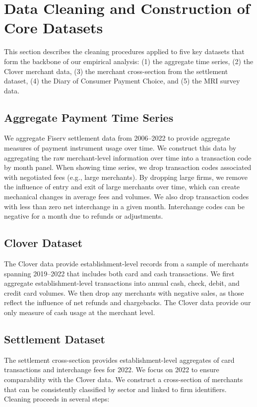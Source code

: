 \documentclass[11pt,english]{article}
\theoremstyle{remark}
\begin{document}
 
\clearpage{}


\section{Data Cleaning and Construction of Core Datasets}

This section describes the cleaning procedures applied to five key datasets that form the backbone of our empirical analysis: (1) the aggregate time series, (2) the Clover merchant data, (3) the merchant cross-section from the settlement dataset, (4) the Diary of Consumer Payment Choice, and (5) the MRI survey data.

\subsection{Aggregate Payment Time Series}

We aggregate Fiserv settlement data from 2006--2022 to provide aggregate measures of payment instrument usage over time.
We construct this data by aggregating the raw merchant-level information over time into a transaction code by month panel.
When showing time series, we drop transaction codes associated with negotiated fees (e.g., large merchants).
By dropping large firms, we remove the influence of entry and exit of large merchants over time, which can create mechanical changes in average fees and volumes.
We also drop transaction codes with less than zero net interchange in a given month.
Interchange codes can be negative for a month due to refunds or adjustments.

\subsection{Clover Dataset}

The Clover data provide establishment-level records from a sample of merchants spanning 2019--2022 that includes both card and cash transactions.
We first aggregate establishment-level transactions into annual cash, check, debit, and credit card volumes.
We then drop any merchants with negative sales, as those reflect the influence of net refunds and chargebacks.
The Clover data provide our only measure of cash usage at the merchant level.

\subsection{Settlement Dataset}

The settlement cross-section provides establishment-level aggregates of card transactions and interchange fees for 2022.
We focus on 2022 to ensure comparability with the Clover data.
We construct a cross-section of merchants that can be consistently classified by sector and linked to firm identifiers.
Cleaning proceeds in several steps:
\end{document}

